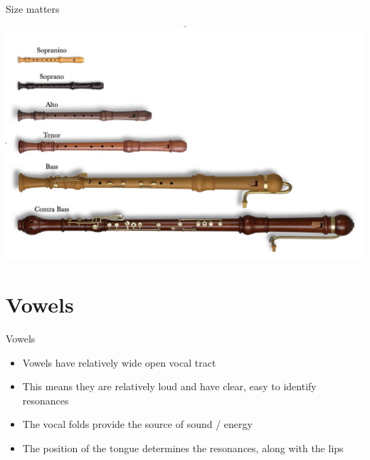 \documentclass[professionalfonts]{beamer}
\begin{document}
\begin{frame}{Size matters}
    \begin{center}
        \href{https://youtu.be/lebTZB0pELc}{\includegraphics[width=\linewidth]{figs/Recorders.jpg}}
    \end{center}
\end{frame}



\section{Vowels}

\begin{frame}{Vowels}
    \begin{itemize}
        \item Vowels have relatively wide open vocal tract
        \item This means they are relatively loud and have clear, easy to identify resonances
        \item The vocal folds provide the source of sound / energy
        \item The position of the tongue determines the resonances, along with the lips
    \end{itemize}
\end{frame}
\end{document}
